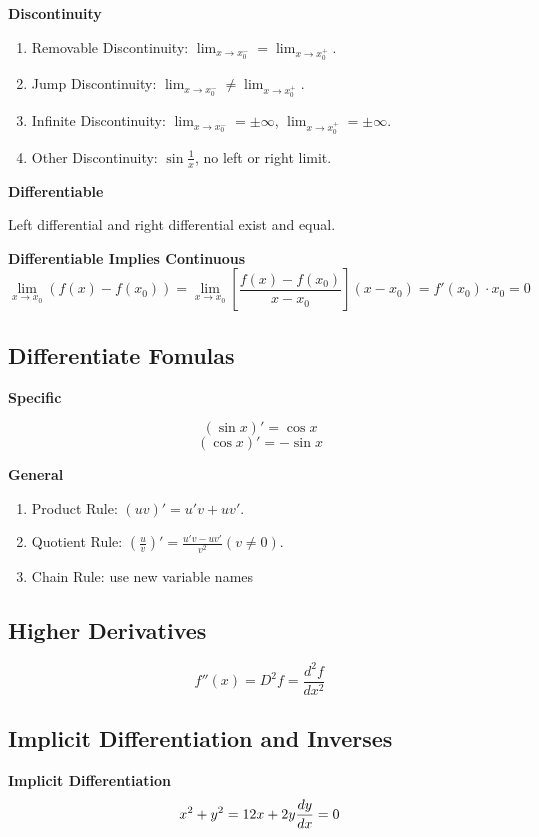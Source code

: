\documentclass{article}
\newcommand\limitx[1]{\lim_{x \to #1}}
\begin{document}
\textbf{Discontinuity}

\begin{enumerate}
\item Removable Discontinuity: $\limitx{x_0^-} = \limitx{x_0^+}$.
\item Jump Discontinuity: $\limitx{x_0^-} \not= \limitx{x_0^+}$.
\item Infinite Discontinuity: $\limitx{x_0^-} = \pm\infty$, $\limitx{x_0^+} = \pm\infty$.
\item Other Discontinuity: $\sin{\frac{1}{x}}$, no left or right limit.
\end{enumerate}

\textbf{Differentiable}

Left differential and right differential exist and equal.

\textbf{Differentiable Implies Continuous}
$$\limitx{x_0}{(f(x)-f(x_0))} = \limitx{x_0}\left[{\frac{f(x)-f(x_0)}{x-x_0}}\right](x-x_0) = f'(x_0) \cdot x_0 = 0$$

\subsection{Differentiate Fomulas}

\textbf{Specific}

$$(\sin x)' = \cos x$$
$$(\cos x)' = -\sin x$$

\textbf{General}

\begin{enumerate}
\item Product Rule: $(uv)' = u'v + uv'$.
\item Quotient Rule: $(\frac{u}{v})' = \frac{u'v-uv'}{v^2}(v \not= 0)$.
\item Chain Rule: use new variable names
\end{enumerate}

\subsection{Higher Derivatives}
$$f''(x) = D^2f = \frac{d^2f}{dx^2}$$

\subsection{Implicit Differentiation and Inverses}

\textbf{Implicit Differentiation}
\begin{equation*}
x^2 + y^2 = 1 \\
2x + 2y\frac{dy}{dx} = 0
\end{equation*}
\end{document}
